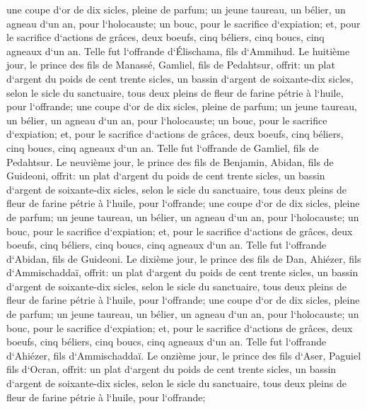 \verse une coupe d`or de dix sicles, pleine de parfum; 
\verse un jeune taureau, un bélier, un agneau d`un an, pour l`holocauste; 
\verse un bouc, pour le sacrifice d`expiation; 
\verse et, pour le sacrifice d`actions de grâces, deux boeufs, cinq béliers, cinq boucs, cinq agneaux d`un an. Telle fut l`offrande d`Élischama, fils d`Ammihud. 
\verse Le huitième jour, le prince des fils de Manassé, Gamliel, fils de Pedahtsur, 
\verse offrit: un plat d`argent du poids de cent trente sicles, un bassin d`argent de soixante-dix sicles, selon le sicle du sanctuaire, tous deux pleins de fleur de farine pétrie à l`huile, pour l`offrande; 
\verse une coupe d`or de dix sicles, pleine de parfum; 
\verse un jeune taureau, un bélier, un agneau d`un an, pour l`holocauste; 
\verse un bouc, pour le sacrifice d`expiation; 
\verse et, pour le sacrifice d`actions de grâces, deux boeufs, cinq béliers, cinq boucs, cinq agneaux d`un an. Telle fut l`offrande de Gamliel, fils de Pedahtsur. 
\verse Le neuvième jour, le prince des fils de Benjamin, Abidan, fils de Guideoni, 
\verse offrit: un plat d`argent du poids de cent trente sicles, un bassin d`argent de soixante-dix sicles, selon le sicle du sanctuaire, tous deux pleins de fleur de farine pétrie à l`huile, pour l`offrande; 
\verse une coupe d`or de dix sicles, pleine de parfum; 
\verse un jeune taureau, un bélier, un agneau d`un an, pour l`holocauste; 
\verse un bouc, pour le sacrifice d`expiation; 
\verse et, pour le sacrifice d`actions de grâces, deux boeufs, cinq béliers, cinq boucs, cinq agneaux d`un an. Telle fut l`offrande d`Abidan, fils de Guideoni. 
\verse Le dixième jour, le prince des fils de Dan, Ahiézer, fils d`Ammischaddaï, 
\verse offrit: un plat d`argent du poids de cent trente sicles, un bassin d`argent de soixante-dix sicles, selon le sicle du sanctuaire, tous deux pleins de fleur de farine pétrie à l`huile, pour l`offrande; 
\verse une coupe d`or de dix sicles, pleine de parfum; 
\verse un jeune taureau, un bélier, un agneau d`un an, pour l`holocauste; 
\verse un bouc, pour le sacrifice d`expiation; 
\verse et, pour le sacrifice d`actions de grâces, deux boeufs, cinq béliers, cinq boucs, cinq agneaux d`un an. Telle fut l`offrande d`Ahiézer, fils d`Ammischaddaï. 
\verse Le onzième jour, le prince des fils d`Aser, Paguiel fils d`Ocran, 
\verse offrit: un plat d`argent du poids de cent trente sicles, un bassin d`argent de soixante-dix sicles, selon le sicle du sanctuaire, tous deux pleins de fleur de farine pétrie à l`huile, pour l`offrande; 
